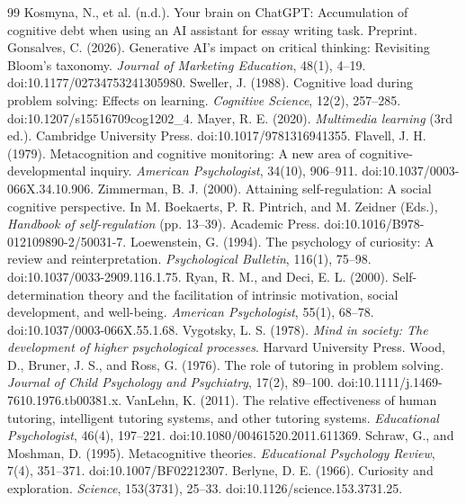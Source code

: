 \begin{thebibliography}{99}
 Kosmyna, N., et al. (n.d.). Your brain on ChatGPT: Accumulation of cognitive debt when using an AI assistant for essay writing task. Preprint.
 Gonsalves, C. (2026). Generative AI's impact on critical thinking: Revisiting Bloom's taxonomy. \emph{Journal of Marketing Education}, 48(1), 4--19. doi:10.1177/02734753241305980.
 Sweller, J. (1988). Cognitive load during problem solving: Effects on learning. \emph{Cognitive Science}, 12(2), 257--285. doi:10.1207/s15516709cog1202\_4.
 Mayer, R. E. (2020). \emph{Multimedia learning} (3rd ed.). Cambridge University Press. doi:10.1017/9781316941355.
 Flavell, J. H. (1979). Metacognition and cognitive monitoring: A new area of cognitive-developmental inquiry. \emph{American Psychologist}, 34(10), 906--911. doi:10.1037/0003-066X.34.10.906.
 Zimmerman, B. J. (2000). Attaining self-regulation: A social cognitive perspective. In M. Boekaerts, P. R. Pintrich, and M. Zeidner (Eds.), \emph{Handbook of self-regulation} (pp. 13--39). Academic Press. doi:10.1016/B978-012109890-2/50031-7.
 Loewenstein, G. (1994). The psychology of curiosity: A review and reinterpretation. \emph{Psychological Bulletin}, 116(1), 75--98. doi:10.1037/0033-2909.116.1.75.
 Ryan, R. M., and Deci, E. L. (2000). Self-determination theory and the facilitation of intrinsic motivation, social development, and well-being. \emph{American Psychologist}, 55(1), 68--78. doi:10.1037/0003-066X.55.1.68.
 Vygotsky, L. S. (1978). \emph{Mind in society: The development of higher psychological processes}. Harvard University Press.
 Wood, D., Bruner, J. S., and Ross, G. (1976). The role of tutoring in problem solving. \emph{Journal of Child Psychology and Psychiatry}, 17(2), 89--100. doi:10.1111/j.1469-7610.1976.tb00381.x.
 VanLehn, K. (2011). The relative effectiveness of human tutoring, intelligent tutoring systems, and other tutoring systems. \emph{Educational Psychologist}, 46(4), 197--221. doi:10.1080/00461520.2011.611369.
 Schraw, G., and Moshman, D. (1995). Metacognitive theories. \emph{Educational Psychology Review}, 7(4), 351--371. doi:10.1007/BF02212307.
 Berlyne, D. E. (1966). Curiosity and exploration. \emph{Science}, 153(3731), 25--33. doi:10.1126/science.153.3731.25.
\end{thebibliography}
